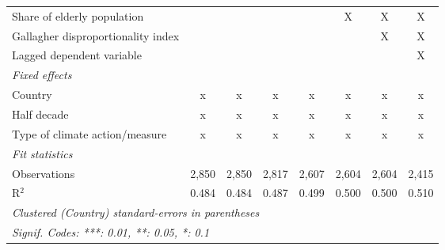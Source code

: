 \begin{tabular}{lccccccc}
   Share of elderly population                                   &                &                &                &               & X             & X             & X\\  
   Gallagher disproportionality index                            &                &                &                &               &               & X             & X\\  
   Lagged dependent variable                                     &                &                &                &               &               &               & X\\  
   \emph{Fixed effects}\\
   Country                                                       & x              & x              & x              & x             & x             & x             & x\\  
   Half decade                                                   & x              & x              & x              & x             & x             & x             & x\\  
   Type of climate action/measure                                & x              & x              & x              & x             & x             & x             & x\\  
   \midrule \emph{Fit statistics}\\
   Observations                                                  & 2,850          & 2,850          & 2,817          & 2,607         & 2,604         & 2,604         & 2,415\\  
   R$^2$                                                         & 0.484          & 0.484          & 0.487          & 0.499         & 0.500         & 0.500         & 0.510\\  
   \midrule
   \multicolumn{8}{l}{\emph{Clustered (Country) standard-errors in parentheses}}\\
   \multicolumn{8}{l}{\emph{Signif. Codes: ***: 0.01, **: 0.05, *: 0.1}}\\
\end{tabular}
\par\endgroup


